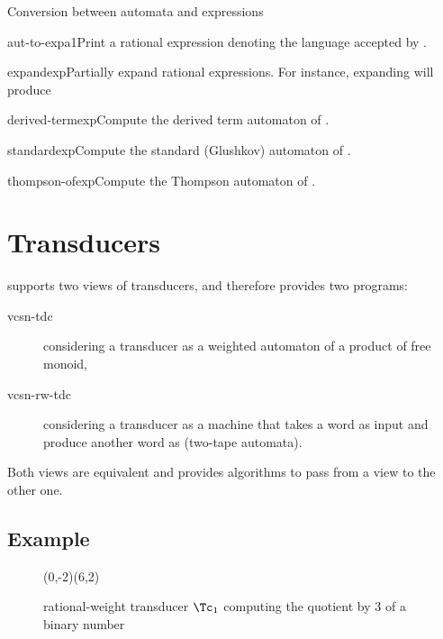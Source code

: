 \begin{fnsection}{Conversion between automata and expressions}
\item{aut-to-exp}{a1}{Print a rational expression denoting the
    language accepted by .}
\item{expand}{exp}{Partially expand rational expressions. For
    instance, expanding  will produce
    }
\item{derived-term}{exp}{Compute the derived term automaton of
    .}
\item{standard}{exp}{Compute the standard (Glushkov) automaton of
    .}
\item{thompson-of}{exp}{Compute the Thompson automaton of .}
  \hline
\end{fnsection}


\newpage
\section{Transducers}
\label{sec:vcsn-tdc}

\Vauc supports two views of transducers, and therefore provides two
programs:
\begin{description}
\item[vcsn-tdc] considering a transducer as a weighted automaton of a
  product of free monoid,
\item[vcsn-rw-tdc] considering a transducer as a machine that takes a
  word as input and produce another word as (two-tape automata).
\end{description}
Both views are equivalent and \Vauc provides algorithms to pass from a
view to the other one.

\subsection{Example}

\begin{figure}[tp]
  \begin{center}
    \begin{VCPicture}{(0,-2)(6,2)}
        
    \end{VCPicture}
    \caption{rational-weight transducer $\Tc_1$ computing the
      quotient by 3 of a binary number}
    \label{fig:t1}
  \end{center}
\end{figure}

